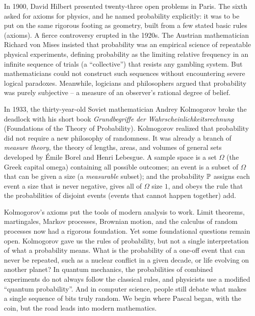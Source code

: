 \begin{historybox}
In 1900, David Hilbert presented twenty-three open problems in Paris. The sixth
asked for axioms for physics, and he named probability explicitly: it was to be
put on the same rigorous footing as geometry, built from a few stated basic
rules (axioms). A fierce controversy erupted in the 1920s.
The Austrian mathematician Richard von Mises insisted that probability was an
empirical science of repeatable physical experiments, defining probability as the
limiting relative frequency in an infinite sequence of trials (a ``collective'')
that resists any gambling system. But mathematicians could not construct such
sequences without encountering severe logical paradoxes. Meanwhile, logicians
and philosophers argued that probability was purely subjective -- a measure of
an observer's rational degree of belief.

In 1933, the thirty-year-old Soviet mathematician Andrey Kolmogorov broke the
deadlock with his short book \emph{Grundbegriffe der Wahrscheinlichkeitsrechnung}
(Foundations of the Theory of Probability). Kolmogorov realized
that probability did not require a new philosophy of randomness. It was
already a branch of \emph{measure theory}, the theory of lengths, areas, and
volumes of general sets developed by \'Emile Borel and Henri Lebesgue.
A sample space is a set $\Omega$ (the Greek capital omega) containing all
possible outcomes; an event is a subset of $\Omega$ that can be given a size
(a \emph{measurable} subset); and the probability $\P$ assigns each event a
size that is never negative, gives all of $\Omega$ size $1$, and obeys the
rule that the probabilities of disjoint events (events that cannot happen
together) add.

Kolmogorov's axioms put the tools of modern analysis to work. Limit theorems,
martingales, Markov processes, Brownian motion, and the calculus of random
processes now had a rigorous foundation. Yet some foundational questions
remain open. Kolmogorov gave us the rules of probability, but not a single
interpretation of what a probability means. What is the probability of a
one-off event that can never be repeated, such as a nuclear conflict in a given
decade, or life evolving on another planet? In quantum mechanics, the
probabilities of combined experiments do not always follow the classical rules,
and physicists use a modified ``quantum probability''. And in computer science,
people still debate what makes a single sequence of bits truly random. We begin
where Pascal began, with the coin, but the road leads into modern mathematics.
\end{historybox}

